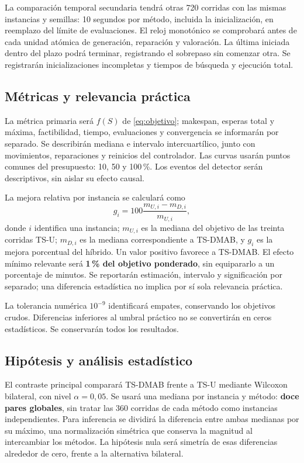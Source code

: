 La comparación temporal secundaria tendrá otras 720 corridas con las mismas
instancias y semillas: 10 segundos por método, incluida la inicialización,
en reemplazo del límite de evaluaciones. El reloj monotónico se comprobará
antes de cada unidad atómica de generación, reparación y valoración.
La última iniciada dentro del plazo podrá terminar, registrando el
sobrepaso sin comenzar otra. Se registrarán inicializaciones incompletas
y tiempos de búsqueda y ejecución total.

\subsection{Métricas y relevancia práctica}
La métrica primaria será $f(S)$ de \eqref{eq:objetivo}; makespan,
esperas total y máxima, factibilidad, tiempo, evaluaciones y convergencia
se informarán por separado. Se describirán mediana e intervalo intercuartílico,
junto con movimientos, reparaciones y reinicios del controlador.
Las curvas usarán puntos comunes del presupuesto: 10, 50 y 100\,\%.
Los eventos del detector serán descriptivos, sin aislar su efecto causal.

La mejora relativa por instancia se calculará como
\begin{equation}
 g_i=100\frac{m_{U,i}-m_{D,i}}{m_{U,i}},
 \label{eq:ganancia}
\end{equation}
\noindent donde $i$ identifica una instancia; $m_{U,i}$ es la mediana
del objetivo de las treinta corridas TS-U; $m_{D,i}$ es la mediana
correspondiente a TS-DMAB, y $g_i$ es la mejora porcentual del híbrido.
Un valor positivo favorece a TS-DMAB.
El efecto mínimo relevante será \textbf{1\,\% del objetivo ponderado},
sin equipararlo a un porcentaje de minutos. Se reportarán estimación,
intervalo y significación por separado; una diferencia estadística
no implica por sí sola relevancia práctica.

La tolerancia numérica $10^{-9}$ identificará empates, conservando los
objetivos crudos. Diferencias inferiores al umbral práctico no se
convertirán en ceros estadísticos. Se conservarán todos los resultados.

\clearpage
\subsection{Hipótesis y análisis estadístico}
El contraste principal comparará TS-DMAB frente a TS-U mediante Wilcoxon
bilateral, con nivel $\alpha=0{,}05$. Se usará una mediana por instancia
y método: \textbf{doce pares globales}, sin tratar las 360 corridas de
cada método como instancias independientes. Para inferencia se dividirá
la diferencia entre ambas medianas por su máximo, una normalización
simétrica que conserva la magnitud al intercambiar los métodos.
La hipótesis nula será simetría de esas diferencias alrededor de cero,
frente a la alternativa bilateral.

